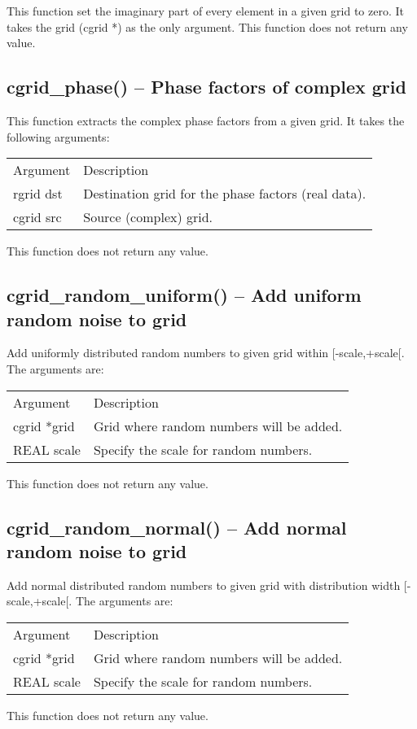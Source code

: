 \documentclass[12pt,letterpaper]{report}
\begin{document}
This function set the imaginary part of every element in a given grid to zero. It takes the grid (cgrid *) as the only argument. This function does not return any value.

\subsection{cgrid\_phase() -- Phase factors of complex grid}

This function extracts the complex phase factors from a given grid. It takes the following arguments:
\begin{longtable}{p{} p{}}
Argument & Description\\
\cline{1-2}
rgrid dst & Destination grid for the phase factors (real data).\\ 
cgrid src & Source (complex) grid.\\
\end{longtable}
\noindent
This function does not return any value.

\subsection{cgrid\_random\_uniform() -- Add uniform random noise to grid}

Add uniformly distributed random numbers to given grid within [-scale,+scale[. The arguments are:
\begin{longtable}{p{} p{}}
Argument & Description\\
\cline{1-2}
cgrid *grid & Grid where random numbers will be added.\\
REAL scale & Specify the scale for random numbers.\\
\end{longtable}
\noindent
This function does not return any value. 

\subsection{cgrid\_random\_normal() -- Add normal random noise to grid}

Add normal distributed random numbers to given grid with distribution width [-scale,+scale[. The arguments are:
\begin{longtable}{p{} p{}}
Argument & Description\\
\cline{1-2}
cgrid *grid & Grid where random numbers will be added.\\
REAL scale & Specify the scale for random numbers.\\
\end{longtable}
\noindent
This function does not return any value. 
\end{document}
